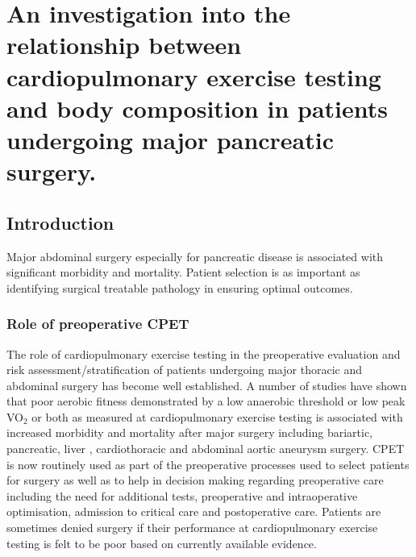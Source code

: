 
\chapter{An investigation into the relationship between cardiopulmonary exercise testing and body composition in patients undergoing major pancreatic surgery.}
\label{ch_bodycomp}


\clearpage

\section{Introduction}
Major abdominal surgery especially for pancreatic disease is associated with significant morbidity and mortality. Patient selection is as important as identifying surgical treatable pathology in ensuring optimal outcomes. \parencite{balthazar_acute_2002}

\subsection{Role of preoperative CPET}
The role of cardiopulmonary exercise testing in the preoperative evaluation and risk assessment/stratification of patients undergoing major thoracic and abdominal surgery has become well established. A number of studies have shown that poor aerobic fitness demonstrated by a low anaerobic threshold or low peak VO$_2$ or both as measured at cardiopulmonary exercise testing is associated with increased morbidity and mortality after major surgery including bariartic\parencite{mccullough_cardiorespiratory_2006}, pancreatic\parencite{chandrabalan_pre-operative_2013,ausania_effects_2012}, liver \parencite{epstein_aerobic_2004}, cardiothoracic\parencite{brunelli_risk_2010, campione_oxygen_2010,torchio_exercise_2010} and abdominal aortic aneurysm surgery.\parencite{carlisle_mid-term_2007,thompson_cardiopulmonary_2011} CPET is now routinely used as part of the preoperative processes used to select patients for surgery as well as to help in decision making regarding preoperative care including the need for additional tests, preoperative and intraoperative optimisation, admission to critical care and postoperative care.
Patients are sometimes denied surgery if their performance at cardiopulmonary exercise testing is felt to be poor based on currently available evidence.

